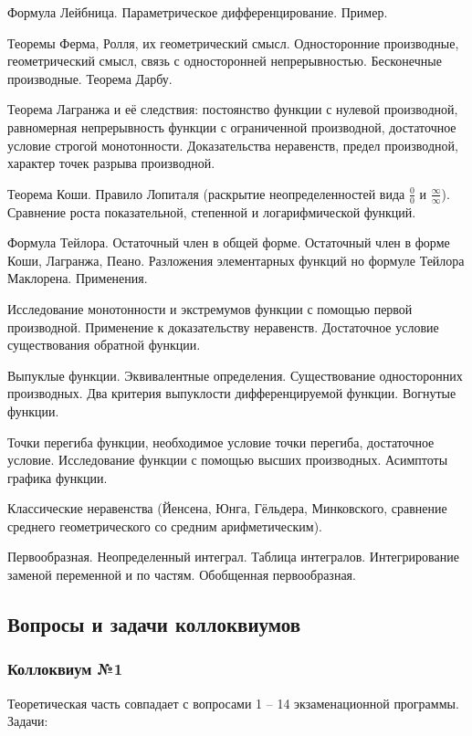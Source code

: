 \documentclass[a4paper]{article}
\begin{document}
\begin{nums}{-2}
Формула Лейбница. Параметрическое дифференцирование. Пример.
\item Теоремы Ферма, Ролля, их геометрический смысл. Односторонние производные, геометрический смысл, связь с
односторонней непрерывностью. Бесконечные производные. Теорема Дарбу.
\item Теорема Лагранжа и её следствия: постоянство функции с нулевой производной, равномерная непрерывность функции
с ограниченной производной, достаточное условие строгой монотонности. Доказательства неравенств, предел производной,
характер точек разрыва производной.
\item Теорема Коши. Правило Лопиталя (раскрытие неопределенностей вида $\frac{0}{0}$ и $\frac{\infty}{\infty}$).
Сравнение роста показательной, степенной и логарифмической функций.
\item Формула Тейлора. Остаточный член в общей форме. Остаточный член в форме Коши, Лагранжа, Пеано. Разложения
элементарных функций но формуле Тейлора Маклорена. Применения.
\item Исследование монотонности и экстремумов функции с помощью первой производной. Применение к доказательству
неравенств. Достаточное условие существования обратной функции.
\item Выпуклые функции. Эквивалентные определения. Существование односторонних производных. Два критерия выпуклости
дифференцируемой функции. Вогнутые функции.
\item Точки перегиба функции, необходимое условие точки перегиба, достаточное условие. Исследование функции
с помощью высших производных. Асимптоты графика функции.
\item Классические неравенства (Йенсена, Юнга, Гёльдера, Минковского, сравнение среднего геометрического
со средним арифметическим).
\item Первообразная. Неопределенный интеграл. Таблица интегралов. Интегрирование заменой переменной и по частям.
Обобщенная первообразная.
\end{nums}

\subsection{Вопросы и задачи коллоквиумов}

\subsubsection{Коллоквиум №1}

Теоретическая часть совпадает с вопросами 1 -- 14 экзаменационной программы. Задачи:
\end{document}
